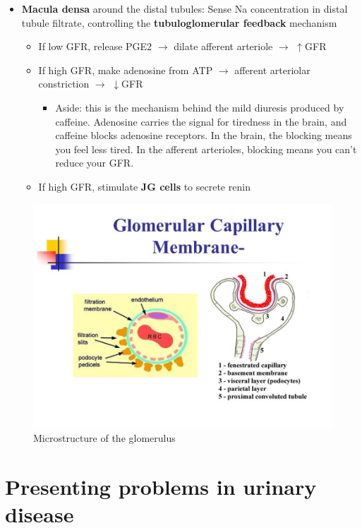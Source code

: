 \documentclass[
  12pt,
]{memoir}
\providecommand{\tightlist}{%
  \setlength{\itemsep}{0pt}\setlength{\parskip}{0pt}}
\begin{document}
\begin{itemize}
\item
  \textbf{Macula densa} around the distal tubules: Sense Na
  concentration in distal tubule filtrate, controlling the
  \textbf{tubuloglomerular feedback} mechanism

  \begin{itemize}
  \tightlist
  \item
    If low GFR, release PGE2 \(\rightarrow\) dilate afferent arteriole
    \(\rightarrow\) \(\uparrow\)GFR
  \item
    If high GFR, make adenosine from ATP \(\rightarrow\) afferent
    arteriolar constriction \(\rightarrow\) \(\downarrow\)GFR

    \begin{itemize}
    \tightlist
    \item
      Aside: this is the mechanism behind the mild diuresis produced by
      caffeine. Adenosine carries the signal for tiredness in the brain,
      and caffeine blocks adenosine receptors. In the brain, the
      blocking means you feel less tired. In the afferent arterioles,
      blocking means you can't reduce your GFR.
    \end{itemize}
  \item
    If high GFR, stimulate \textbf{JG cells} to secrete renin
  \end{itemize}
\end{itemize}

\begin{figure}[h!]
    \centering
    \includegraphics[width=.7\textwidth]{../assets/med/glomerulus.jpg}
    \caption{Microstructure of the glomerulus}
    \label{fig:glomerulus}
\end{figure}

\hypertarget{presenting-problems-in-urinary-disease}{%
\section{Presenting problems in urinary
disease}\label{presenting-problems-in-urinary-disease}}
\end{document}
